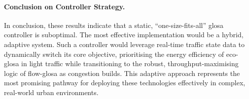 \paragraph{Conclusion on Controller Strategy.}
In conclusion, these results indicate that a static, \enquote{one-size-fits-all} \ac{glosa} controller is suboptimal. The most effective implementation would be a hybrid, adaptive system. Such a controller would leverage real-time traffic state data to dynamically switch its core objective, prioritising the energy efficiency of \ac{eco-glosa} in light traffic while transitioning to the robust, throughput-maximising logic of \ac{flow-glosa} as congestion builds. This adaptive approach represents the most promising pathway for deploying these technologies effectively in complex, real-world urban environments.

\begin{table}[htb]
  \centering
  \caption[CO2 Emission Difference: Eco-GLOSA vs. Flow-GLOSA]{Difference in CO\textsubscript{2} emissions, measured in $\unit{\gram\per\kilo\metre}$, between the \ac{eco-glosa} and \ac{flow-glosa} controllers. The values are tabulated across all simulated traffic volumes and market penetration rates. A positive value signifies that \ac{eco-glosa} achieved a better fuel economy.}
  \label{tab:BreakEven_EcoVsFlow}
\end{table}

